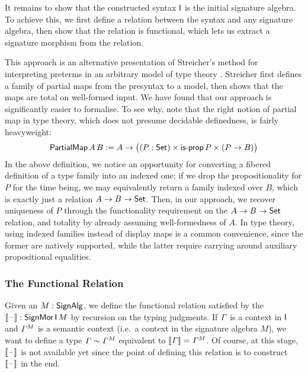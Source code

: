 It remains to show that the constructed syntax $\mathsf{I}$ is the initial
signature algebra. To achieve this, we first define a relation between
the syntax and any signature algebra, then show that the relation is
functional, which lets us extract a signature morphism from the relation.

This approach is an alternative presentation of Streicher's method for
interpreting preterms in an arbitrary model of type theory
\cite{streichersemantics}. Streicher first defines a family of partial
maps from the presyntax to a model, then shows that the maps are total
on well-formed input. We have found that our approach is significantly
easier to formalise. To see why, note that the right notion of partial
map in type theory, which does not presume decidable definedness, is
fairly heavyweight:
\[
  \mathsf{PartialMap}\,A\,B := A\rightarrow \big((P : \mathsf{Set})\times\mathsf{is\text{-}prop}\,P\times (P \rightarrow B)\big)
\]
In the above definition, we notice an opportunity for converting a fibered
definition of a type family into an indexed one; if we drop the propositionality
for $P$ for the time being, we may equivalently return a family indexed over
$B$, which is exactly just a relation $A\rightarrow B\rightarrow\mathsf{Set}$. Then, in our approach, we
recover uniqueness of $P$ through the functionality requirement on the $A\rightarrow
B\rightarrow\mathsf{Set}$ relation, and totality by already assuming well-formedness of $A$. In
type theory, using indexed families instead of display maps is a common
convenience, since the former are natively supported, while the
latter require carrying around auxiliary propositional equalities.

\subsubsection{The Functional Relation}

Given an $M : \mathsf{SignAlg}$, we define the functional relation satisfied by
the  $\llbracket\mathord{\hspace{1pt}\text{--}\hspace{1pt}}\rrbracket : \mathsf{SignMor}\,\mathsf{I}\, M$ by recursion on the typing judgments.
If $\mathit{\Gamma}$ is a context in $\mathsf{I}$ and ${\mathit{\Gamma}}^M$ is a semantic context
(i.e.\ a context in the signature algebra $M$), we want to define a type
$\mathit{\Gamma}\sim {\mathit{\Gamma}}^M$ equivalent to $\llbracket\mathit{\Gamma}\rrbracket ={\mathit{\Gamma}}^M$. Of
course, at this stage, $\llbracket\mathord{\hspace{1pt}\text{--}\hspace{1pt}}\rrbracket$ is not available yet since the point of
defining this relation is to construct $\llbracket\mathord{\hspace{1pt}\text{--}\hspace{1pt}}\rrbracket$ in the end.

